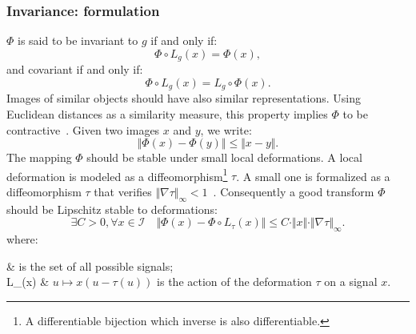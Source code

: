         \subsubsection{Invariance: formulation}
            $\Phi$ is said to be invariant to $g$ if and only if:
            \begin{equation}
                \label{eq::invariance}
                \Phi\circ L_g\left(x\right) = \Phi(x),
            \end{equation}
            and covariant if and only if:
            \begin{equation}
                \label{eq::covariance}
                \Phi\circ L_g\left(x\right) = L_g\circ\Phi(x).
            \end{equation}
            Images of similar objects should have also similar representations.
            Using Euclidean distances as a similarity measure, this property implies $\Phi$ to be contractive~\parencite{bruna2013invariant}.
            Given two images $x$ and $y$, we write:
            \begin{equation}
                \label{eq::contractive}
                \Vert \Phi(x) - \Phi(y) \Vert \leq \Vert x-y \Vert.
            \end{equation}
            The mapping $\Phi$ should be stable under small local deformations.
            A local deformation is modeled as a diffeomorphism\footnote{A differentiable bijection which inverse is also differentiable.} $\tau$.
            A small one is formalized as a diffeomorphism $\tau$ that verifies $\Vert\nabla \tau\Vert_\infty < 1$~\parencite{mallat2012group,bruna2013invariant,sifre2013rotation}.
            Consequently a good transform $\Phi$ should be Lipschitz stable to deformations:
            \begin{equation}
                \label{eq::stable_deformation}
                \exists C >0, \forall x \in \mathscr{I}\quad \Vert \Phi(x) - \Phi\circ L_\tau(x) \Vert \leq C \cdot \Vert x\Vert \cdot \Vert\nabla \tau\Vert_\infty.
            \end{equation}
            where:
            \begin{conditions}
                 & is the set of all possible signals;\\
                L_\tau(x) & $u \mapsto x(u - \tau(u))$ is the action of the deformation $\tau$ on a signal $x$.
            \end{conditions}

